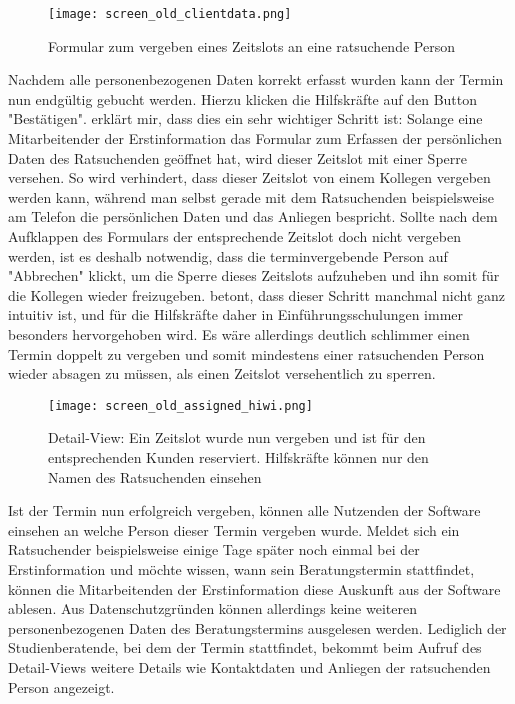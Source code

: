 \begin{figure}[H]
    \caption{Formular zum vergeben eines Zeitslots an eine ratsuchende Person}
    \centering
    \texttt{[image: screen\_old\_clientdata.png]}
\end{figure}

Nachdem alle personenbezogenen Daten korrekt erfasst wurden kann der Termin nun
endgültig gebucht werden. Hierzu klicken die Hilfskräfte auf den Button
"Bestätigen". \ipName erklärt mir, dass dies ein sehr wichtiger Schritt ist:
Solange eine Mitarbeitender der Erstinformation das Formular zum Erfassen der
persönlichen Daten des Ratsuchenden geöffnet hat, wird dieser Zeitslot mit
einer Sperre versehen. So wird verhindert, dass dieser Zeitslot von einem
Kollegen vergeben werden kann, während man selbst gerade mit dem Ratsuchenden
beispielsweise am Telefon die persönlichen Daten und das Anliegen bespricht.
Sollte nach dem Aufklappen des Formulars der entsprechende Zeitslot doch nicht
vergeben werden, ist es deshalb notwendig, dass die terminvergebende Person auf
"Abbrechen" klickt, um die Sperre dieses Zeitslots aufzuheben und ihn somit für
die Kollegen wieder freizugeben. \ipName betont, dass dieser Schritt manchmal
nicht ganz intuitiv ist, und für die Hilfskräfte daher in Einführungsschulungen
immer besonders hervorgehoben wird. Es wäre allerdings deutlich schlimmer einen
Termin doppelt zu vergeben und somit mindestens einer ratsuchenden Person
wieder absagen zu müssen, als einen Zeitslot versehentlich zu sperren.

\begin{figure}[H]
    \caption{Detail-View: Ein Zeitslot wurde nun vergeben und ist für den entsprechenden Kunden reserviert. Hilfskräfte können nur den Namen des Ratsuchenden einsehen}
    \centering
    \texttt{[image: screen\_old\_assigned\_hiwi.png]}
\end{figure}

Ist der Termin nun erfolgreich vergeben, können alle Nutzenden der Software
einsehen an welche Person dieser Termin vergeben wurde. Meldet sich ein
Ratsuchender beispielsweise einige Tage später noch einmal bei der
Erstinformation und möchte wissen, wann sein Beratungstermin stattfindet,
können die Mitarbeitenden der Erstinformation diese Auskunft aus der Software
ablesen. Aus Datenschutzgründen können allerdings keine weiteren
personenbezogenen Daten des Beratungstermins ausgelesen werden. Lediglich der
Studienberatende, bei dem der Termin stattfindet, bekommt beim Aufruf des
Detail-Views weitere Details wie Kontaktdaten und Anliegen der ratsuchenden
Person angezeigt.

